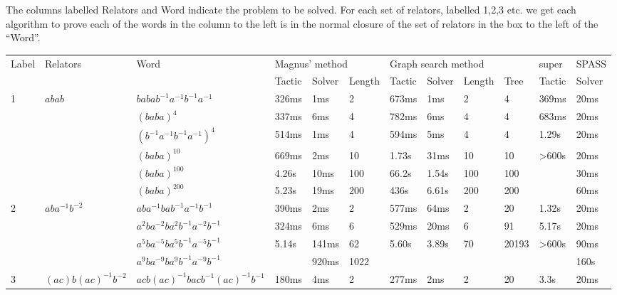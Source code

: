 \documentclass[12pt]{article} %
\theoremstyle{definition}
\theoremstyle{definition}
\theoremstyle{definition}
\theoremstyle{definition}
\begin{document}
The columns labelled Relators and Word indicate the problem to be solved.
For each set of relators, labelled 1,2,3 etc. we get each algorithm to prove
each of the words in the column to the left is in the normal closure of the
set of relators in the box to the left of the ``Word''.


\pagebreak
\begin{landscape}
\begin{longtable}[!h]{l|l|l|lll|llll|l|l}
  \hline
  \multirow{2}{*}{Label} & \multirow{2}{*}{Relators} & \multirow{2}{*}{Word} & \multicolumn{3}{l|}{Magnus' method} & \multicolumn{4}{l|}{Graph search method} & super & SPASS \\ \cline{4-12}
   &  &  & Tactic & Solver & Length & Tactic & Solver & Length & Tree & Tactic & Solver \\ \hline
  \endhead
  \multirow{6}{*}{1} & \multirow{6}{*}{$abab$} & $babab^{-1}a^{-1}b^{-1}a^{-1}$ & 326ms & 1ms & 2 & 673ms & 1ms & 2 & 4 & 369ms & 20ms \\
   &  & $(baba)^4$ & 337ms & 6ms & 4 & 782ms & 6ms & 4 & 4 & 683ms & 20ms \\
   &  & $(b^{-1}a^{-1}b^{-1}a^{-1})^4$ & 514ms & 1ms & 4 & 594ms & 5ms & 4 & 4 & 1.29s & 20ms \\
   &  & $(baba)^{10}$ & 669ms & 2ms & 10 & 1.73s & 31ms & 10 & 10 & \textgreater{}600s & 20ms \\
   &  & $(baba)^{100}$ & 4.26s & 10ms & 100 & 66.2s & 1.54s & 100 & 100 &  & 30ms \\
   &  & $(baba)^{200}$ & 5.23s & 19ms & 200 & 436s & 6.61s & 200 & 200 &  & 60ms \\ \hline
  \multirow{4}{*}{2} & \multirow{4}{*}{$aba^{-1}b^{-2}$} & $aba^{-1}bab^{-1}a^{-1}b^{-1}$ & 390ms & 2ms & 2 & 577ms & 64ms & 2 & 20 & 1.32s & 20ms \\
   &  & $a^2ba^{-2}ba^2b^{-1}a^{-2}b^{-1}$ & 324ms & 6ms & 6 & 529ms & 20ms & 6 & 91 & 5.17s & 20ms \\
   &  & $a^5ba^{-5}ba^5b^{-1}a^{-5}b^{-1}$ & 5.14s & 141ms & 62 & 5.60s & 3.89s & 70 & 20193 & \textgreater{}600s & 90ms \\
   &  & $a^9ba^{-9}ba^9b^{-1}a^{-9}b^{-1}$ &  & 920ms & 1022 &  &  &  &  &  & 160s \\ \hline
  \multirow{3}{*}{3} & \multirow{3}{*}{$(ac)b(ac)^{-1}b^{-2}$} & $acb(ac)^{-1}bacb^{-1}(ac)^{-1}b^{-1}$ & 180ms & 4ms & 2 & 277ms & 2ms & 2 & 20 & 3.3s & 20ms \\

\end{longtable}
\end{landscape}
\end{document}
